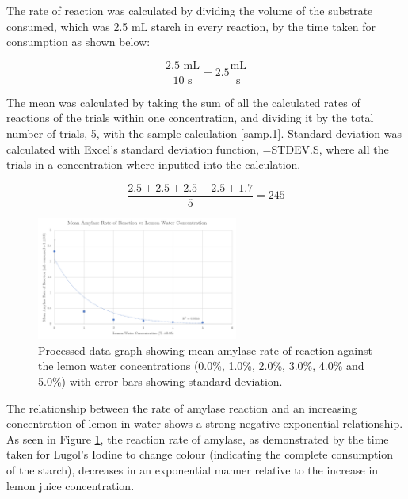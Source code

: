 \documentclass[12pt]{article}
\begin{document}
\vspace{-15mm}

The rate of reaction was calculated by dividing the volume of the substrate consumed, which was 2.5 mL starch in every reaction, by the time taken for consumption as shown below:

\vspace{-5mm}

\begin{equation}\label{samp.2}
    \frac{2.5 \text{ mL}}{10 \text{ s}} = 2.5 \frac{\text{mL}}{\text{s}}
\end{equation}

The mean was calculated by taking the sum of all the calculated rates of reactions of the trials within one concentration, and dividing it by the total number of trials, 5, with the sample calculation \ref{samp.1}. Standard deviation was calculated with Excel's standard deviation function, =STDEV.S, where all the trials in a concentration where inputted into the calculation.

\begin{equation}\label{samp.1}
    \frac{2.5+2.5+2.5+2.5+1.7}{5} = 245
\end{equation}


\begin{figure}[h]
    \centering
    \caption{Processed data graph showing mean amylase rate of reaction against the lemon water concentrations (0.0\%, 1.0\%, 2.0\%, 3.0\%, 4.0\% and 5.0\%) with error bars showing standard deviation.}
    \label{fig:graphh}
    \includegraphics[width=0.59\textwidth]{images/graph.png}
\end{figure}

The relationship between the rate of amylase reaction and an increasing concentration of lemon in water shows a strong negative exponential relationship. As seen in Figure \ref{fig:graphh}, the reaction rate of amylase, as demonstrated by the time taken for Lugol's Iodine to change colour (indicating the complete consumption of the starch), decreases in an exponential manner relative to the increase in lemon juice concentration.
\end{document}
